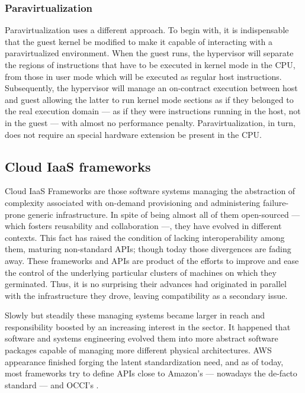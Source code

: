 \subsubsection{Paravirtualization}\label{subsubsec:paravirt}
\noindent Paravirtualization uses a different approach. To begin with, it is indispensable that the guest kernel be modified to make it capable of interacting with a paravirtualized environment. When the guest runs, the hypervisor will separate the regions of instructions that have to be executed in kernel mode in the CPU, from those in user mode which will be executed as regular host instructions. Subsequently, the hypervisor will manage an on-contract execution between host and guest allowing the latter to run kernel mode sections as if they belonged to the real execution domain --- as if they were instructions running in the host, not in the guest --- with almost no performance penalty. Paravirtualization, in turn, does not require an special hardware extension be present in the CPU.

\subsection{Cloud IaaS frameworks}\label{subsec:frameworksiaas}
\noindent Cloud IaaS Frameworks are those software systems managing the abstraction of complexity associated with on-demand provisioning and administering failure-prone generic infrastructure. In spite of being almost all of them open-sourced --- which fosters reusability and collaboration ---, they have evolved in different contexts. This fact has raised the condition of lacking interoperability among them, maturing non-standard APIs; though today those divergences are fading away. These frameworks and APIs are product of the efforts to improve and ease the control of the underlying particular clusters of machines on which they germinated. Thus, it is no surprising their advances had originated in parallel with the infrastructure they drove, leaving compatibility as a secondary issue.

Slowly but steadily these managing systems became larger in reach and responsibility boosted by an increasing interest in the sector. It happened that software and systems engineering evolved them into more abstract software packages capable of managing more different physical architectures. AWS appearance finished forging the latent standardization need, and as of today, most frameworks try to define APIs close to Amazon's --- nowadays the de-facto standard --- and OCCI's \cite{occisdraft}.

